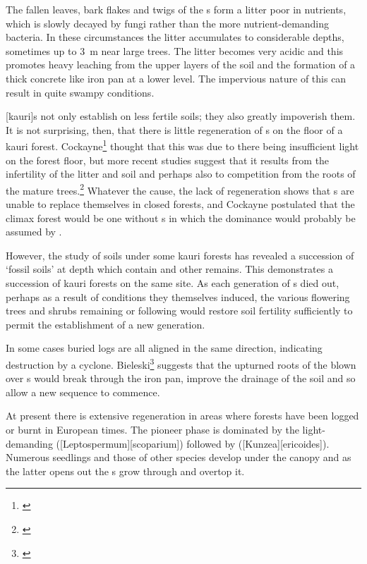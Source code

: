 The fallen leaves, bark flakes and twigs of the s form a litter poor in nutrients, which is slowly decayed by fungi rather than the more nutrient-demanding bacteria.
In these circumstances the litter accumulates to considerable depths, sometimes up to \SI{3}{\metre} near large trees.
The litter becomes very acidic and this promotes heavy leaching from the upper layers of the soil and the formation of a thick concrete like iron pan at a lower level.
The impervious nature of this can result in quite swampy conditions.

[kauri]s not only establish on less fertile soils; they also greatly impoverish them.
It is not surprising, then, that there is little regeneration of s on the floor of a kauri forest.
Cockayne\footnote{\cite{cockayne1928vegetation}} thought that this was due to there being insufficient light on the forest floor, but more recent studies suggest that it results from the infertility of the litter and soil and perhaps also to competition from the roots of the mature trees.\footnote{\cite{bieleski1959factors}}
Whatever the cause, the lack of regeneration shows that s are unable to replace themselves in closed forests, and Cockayne postulated that the climax forest would be one without s in which the dominance would probably be assumed by .

However, the study of soils under some kauri forests has revealed a succession of `fossil soils' at depth which contain  and other remains.
This demonstrates a succession of kauri forests on the same site.
As each generation of s died out, perhaps as a result of conditions they themselves induced, the various flowering trees and shrubs remaining or following would restore soil fertility sufficiently to permit the establishment of a new  generation.

In some cases buried  logs are all aligned in the same direction, indicating destruction by a cyclone.
Bieleski\footnote{\cite{bieleski1959factors}} suggests that the upturned roots of the blown over s would break through the iron pan, improve the drainage of the soil and so allow a new sequence to commence.

At present there is extensive  regeneration in areas where forests have been logged or burnt in European times.
The pioneer phase is dominated by the light-demanding  ([Leptospermum][scoparium]) followed by  ([Kunzea][ericoides]).
Numerous  seedlings and those of other species develop under the  canopy and as the latter opens out the s grow through and overtop it.

